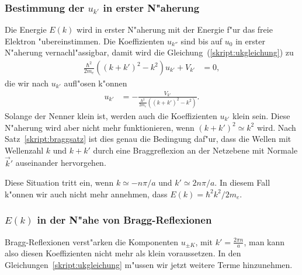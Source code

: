 \subsubsection{Bestimmung der $u_{k'}$ in erster N"aherung}
Die Energie $E(k)$ wird in erster N"aherung mit der Energie f"ur das
freie Elektron "ubereinstimmen.
Die Koeffizienten $u_{k''}$ sind bis auf $u_0$ in erster N"aherung
vernachl"assigbar, damit wird die Gleichung~(\ref{skript:ukgleichung})
zu
\begin{align*}
\frac{\hbar^2}{2m_e}((k+k')^2 -k^2)
u_{k'}
+
V_{k'}
&=
0,
\end{align*}
die wir nach $u_{k'}$ aufl"osen k"onnen
\begin{align*}
u_{k'}
&=
-
\frac{\displaystyle V_{k'}}{
\displaystyle
\frac{\hbar^2}{2m_e}((k+k')^2 -k^2)
}.
\end{align*}
Solange der Nenner klein ist, werden auch die Koeffizienten $u_{k'}$
klein sein.
Diese N"aherung wird aber nicht mehr funktionieren, wenn $(k+k')^2\simeq k^2$
wird.
Nach Satz~\ref{skript:braggsatz} ist dies genau die Bedingung daf"ur,
dass die Wellen mit Wellenzahl $k$ und $k+k'$ durch eine Braggreflexion
an der Netzebene mit Normale $\vec k'$ auseinander hervorgehen.

Diese Situation tritt ein, wenn $k\simeq -n\pi/a$ und $k'\simeq 2n\pi/a$.
In diesem Fall k"onnen wir auch nicht mehr annehmen,
dass $E(k)=\hbar^2k^2/2m_e$.

%

\subsubsection{$E(k)$ in der N"ahe von Bragg-Reflexionen}
Bragg-Reflexionen verst"arken die Komponenten $u_{\pm K}$,
mit $k'=\frac{2\pi n}a$, man kann also diesen Koeffizienten nicht mehr
als klein voraussetzen.
In den Gleichungen~\ref{skript:ukgleichung} m"ussen wir jetzt weitere
Terme hinzunehmen.

